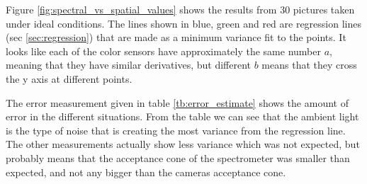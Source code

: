 Figure \ref{fig:spectral_vs_spatial_values} shows the results from 30 pictures taken under ideal conditions. The lines shown in blue, green and red are regression lines (sec \ref{sec:regression}) that are made as a minimum variance fit to the points. It looks like each of the color sensors have approximately the same number $a$, meaning that they have similar derivatives, but different $b$ means that they cross the y axis at different points. 

The error measurement given in table \ref{tb:error_estimate} shows the amount of error in the different situations. From the table we can see that the ambient light is the type of noise that is creating the most variance from the regression line. The other measurements actually show less variance which was not expected, but probably means that the acceptance cone of the spectrometer was smaller than expected, and not any bigger than the cameras acceptance cone. 